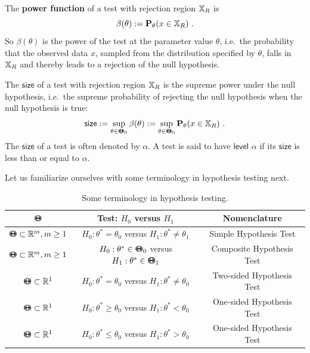\begin{definition}
The {\bf power function} of a test with rejection region $\mathbb{X}_R$ is
\begin{equation}\label{E:power}
\beta(\theta) := \mathbf{P}_{\theta}(x \in \mathbb{X}_R) \ .
\end{equation}
So $\beta(\theta)$ is the power of the test at the parameter value $\theta$, i.e.~the probability that the observed data $x$, sampled from the distribution specified by $\theta$, falls in $\mathbb{X}_R$ and thereby leads to a rejection of the null hypothesis.

The $\mathsf{size}$ of a test with rejection region $\mathbb{X}_R$ is the supreme power under the null hypothesis, i.e.~the supreme probability of rejecting the null hypothesis when the null hypothesis is true:
\begin{equation}\label{E:size}
\mathsf{size} := \sup_{\theta \in {\Theta}\mspace{-11 mu}{\Theta}_0} \beta(\theta) := \sup_{\theta \in {\Theta}\mspace{-11 mu}{\Theta}_0} \mathbf{P}_{\theta}(x \in \mathbb{X}_R) \ .
\end{equation}
The $\mathsf{size}$ of a test is often denoted by $\alpha$.  A test is said to have $\mathsf{level}$ $\alpha$ if its $\mathsf{size}$ is less than or equal to $\alpha$.
\end{definition}
Let us familiarize ourselves with some terminology in hypothesis testing next.
\begin{table}[htbp]
\begin{center}
\caption{Some terminology in hypothesis testing.}
\begin{tabular}{c|c|c}\hline
${\Theta}\mspace{-11 mu}{\Theta}$ & Test: $H_0$ versus $H_1$ & Nomenclature \\ \hline
${\Theta}\mspace{-11 mu}{\Theta} \subset \mathbb{R}^m, m \geq 1$ & $H_0: \theta^* = \theta_0$ versus $H_1: \theta^* \neq \theta_1$ & Simple Hypothesis Test \\ \hline
${\Theta}\mspace{-11 mu}{\Theta} \subset \mathbb{R}^m, m \geq 1$ & $H_0: \theta^* \in {\Theta}\mspace{-11 mu}{\Theta}_0$ versus $H_1: \theta^* \in {\Theta}\mspace{-11 mu}{\Theta}_1 $ & Composite Hypothesis Test \\ \hline
${\Theta}\mspace{-11 mu}{\Theta} \subset \mathbb{R}^1$ & $H_0: \theta^* = \theta_0$ versus $H_1: \theta^* \neq \theta_0$ & Two-sided Hypothesis Test \\ \hline
${\Theta}\mspace{-11 mu}{\Theta} \subset \mathbb{R}^1$ & $H_0: \theta^* \geq \theta_0$ versus $H_1: \theta^* < \theta_0$ & One-sided Hypothesis Test \\ \hline
${\Theta}\mspace{-11 mu}{\Theta} \subset \mathbb{R}^1$ & $H_0: \theta^* \leq \theta_0$ versus $H_1: \theta^* > \theta_0$ & One-sided Hypothesis Test \\ \hline
\end{tabular}
\end{center}
\end{table}

